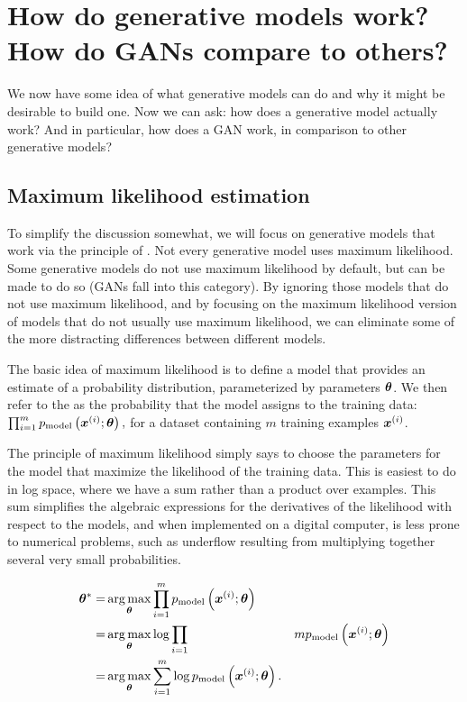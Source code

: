 \section{How do generative models work? How do GANs compare to others?}
\label{sec:tree}

We now have some idea of what generative models can do and why it might be
desirable to build one.
Now we can ask: how does a generative model actually work? And in particular,
how does a GAN work, in comparison to other generative models?

\subsection{Maximum likelihood estimation}

To simplify the discussion somewhat, we will focus on generative models
that work via the principle of .
Not every generative model uses maximum likelihood.
Some generative models do not use maximum likelihood by default, but
can be made to do so (GANs fall into this category).
By ignoring those models that do not use maximum likelihood, and
by focusing on the maximum likelihood version of models that do not
usually use maximum likelihood, we can eliminate some of the more 
distracting differences between different models.

The basic idea of maximum likelihood is to define a model that provides
an estimate of a probability distribution, parameterized by parameters
${\bm{\theta}}$.
We then refer to the  as the probability that the model
assigns to the training data: $\prod_{i=1}^m p_{\rm{model}}\left({\bm{x}}^{(i)}; {\bm{\theta}} \right),$
for a dataset containing $m$ training examples ${\bm{x}}^{(i)}$.

The principle of maximum likelihood simply says to choose the parameters for the model
that maximize the likelihood of the training data.
This is easiest to do in log space, where we have a sum rather than a product
over examples.
This sum simplifies the algebraic expressions for the derivatives of the likelihood
with respect to the models, and when implemented on a digital computer, is less
prone to numerical problems, such as underflow resulting from multiplying together
several very small probabilities.

\begin{align}
{\bm{\theta}}^* =& \operatorname*{arg\,max}_{\bm{\theta}} \prod_{i=1}^m p_{\rm{model}}\left({\bm{x}}^{(i)}; {\bm{\theta}} \right) \\
  =& \operatorname*{arg\,max}_{\bm{\theta}} \log \prod_{i=1}&m p_{\rm{model}}\left({\bm{x}}^{(i)}; {\bm{\theta}} \right) \label{eq:log} \\
          =& \operatorname*{arg\,max}_{\bm{\theta}} \sum_{i=1}^m \log p_{\rm{model}}\left({\bm{x}}^{(i)}; {\bm{\theta}} \right).
\end{align}

